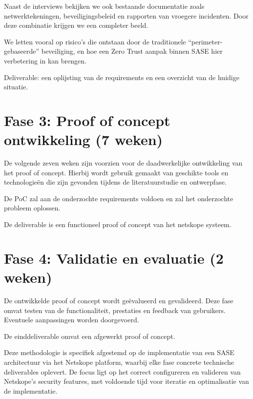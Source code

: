\vspace{2ex}

Naast de interviews bekijken we ook bestaande documentatie zoals netwerktekeningen, beveiligingsbeleid en rapporten van vroegere incidenten. Door deze combinatie krijgen we een completer beeld. 

\vspace{2ex}

We letten vooral op risico’s die ontstaan door de traditionele “perimeter-gebaseerde” beveiliging, en hoe een Zero Trust aanpak binnen SASE hier verbetering in kan brengen. 

\vspace{2ex}

Deliverable: een oplijsting van de requirements en een overzicht van de huidige situatie.

\section{Fase 3: Proof of concept ontwikkeling (7 weken)}
De volgende zeven weken zijn voorzien voor de daadwerkelijke ontwikkeling van het
proof of concept. Hierbij wordt gebruik gemaakt van geschikte tools en technologieën die zijn gevonden tijdens de literatuurstudie en ontwerpfase.

\vspace{2ex}

De PoC zal aan de onderzochte requirements voldoen en zal het onderzochte probleem oplossen. 

\vspace{2ex}

De deliverable is een functioneel proof of concept van het netskope systeem.

\section{Fase 4: Validatie en evaluatie (2 weken)}
De ontwikkelde proof of concept wordt geëvalueerd en gevalideerd. Deze fase omvat testen van de functionaliteit, prestaties en
feedback van gebruikers. Eventuele aanpassingen worden doorgevoerd. 

\vspace{2ex}

De einddeliverable omvat een afgewerkt proof of concept.

\vspace{4ex}

Deze methodologie is specifiek afgestemd op de implementatie van een SASE architectuur via het Netskope platform, waarbij elke fase concrete technische deliverables oplevert. De focus ligt op het correct configureren en valideren van Netskope's security features, met voldoende tijd voor iteratie en optimalisatie van de implementatie.

